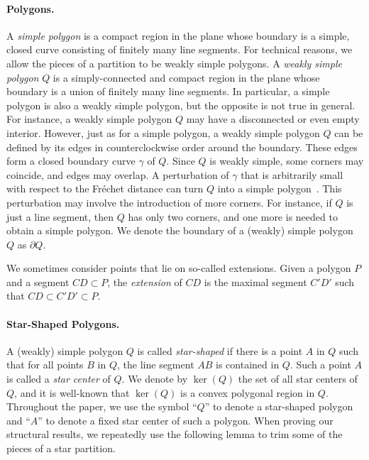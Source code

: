 \documentclass[10pt,a4paper]{article}
\begin{document}
\paragraph{Polygons.}
A \emph{simple polygon} is a compact region in the plane whose boundary is a simple, closed curve consisting of finitely many line segments.
For technical reasons, we allow the pieces of a partition to be weakly simple polygons. 
A \emph{weakly simple polygon} $Q$ is a simply-connected and compact region in the plane whose boundary is a union of finitely many line segments.
In particular, a simple polygon is also a weakly simple polygon, but the opposite is not true in general.
For instance, a weakly simple polygon $Q$ may have a disconnected or even empty interior.
However, just as for a simple polygon, a weakly simple polygon $Q$ can be defined by its edges in counterclockwise order around the boundary.
These edges form a closed boundary curve $\gamma$ of $Q$.
Since $Q$ is weakly simple, some corners may coincide, and edges may overlap.
A perturbation of $\gamma$ that is arbitrarily small with respect to the Fréchet distance can turn $Q$ into a simple polygon~\cite{DBLP:journals/dcg/AkitayaAET17,DBLP:conf/soda/ChangEX15}.
This perturbation may involve the introduction of more corners.
For instance, if $Q$ is just a line segment, then $Q$ has only two corners, and one more is needed to obtain a simple polygon.
We denote the boundary of a (weakly) simple polygon $Q$ as $\partial Q$.

We sometimes consider points that lie on so-called extensions.
Given a polygon $P$ and a segment $CD\subset P$, the \emph{extension} of $CD$ is the maximal segment $C'D'$ such that $CD\subset C'D'\subset P$.

\paragraph{Star-Shaped Polygons.}
A (weakly) simple polygon $Q$ is called \emph{star-shaped} if there is a point $A$ in $Q$ such that for all points $B$ in $Q$, the line segment $AB$ is contained in $Q$.
Such a point $A$ is called a \emph{star center} of $Q$.
We denote by $\ker(Q)$ the set of all star centers of $Q$, and it is well-known that $\ker(Q)$ is a convex polygonal region in $Q$.
Throughout the paper, we use the symbol ``$Q$'' to denote a star-shaped polygon and ``$A$'' to denote a fixed star center of such a polygon.
When proving our structural results, we repeatedly use the following lemma to trim some of the pieces of a star partition.
\end{document}
